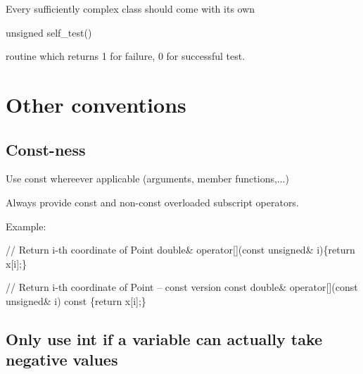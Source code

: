 \begin{DoxyItemize}
\item Every sufficiently complex class should come with its own 
\begin{DoxyCode}
\textcolor{keywordtype}{unsigned} self\_test() 
\end{DoxyCode}
 routine which returns 1 for failure, 0 for successful test.
\end{DoxyItemize}



 

\hypertarget{index_other}{}\section{Other conventions}\label{index_other}
\hypertarget{index_constness}{}\subsection{Const-\/ness}\label{index_constness}

\begin{DoxyItemize}
\item Use const whereever applicable (arguments, member functions,...)
\item Always provide const and non-\/const overloaded subscript operators.
\item Example\-: 
\begin{DoxyCode}
\textcolor{comment}{// Return i-th coordinate of Point}
 \textcolor{keywordtype}{double}& operator[](\textcolor{keyword}{const} \textcolor{keywordtype}{unsigned}& i)\{\textcolor{keywordflow}{return} x[i];\}  

\textcolor{comment}{// Return i-th coordinate of Point -- const version}
\textcolor{keyword}{const} \textcolor{keywordtype}{double}& operator[](\textcolor{keyword}{const} \textcolor{keywordtype}{unsigned}& i)\textcolor{keyword}{ const }\{\textcolor{keywordflow}{return} x[i];\} 
\end{DoxyCode}

\end{DoxyItemize}\hypertarget{index_unsigned}{}\subsection{Only use int if a variable can actually take negative values}\label{index_unsigned}

